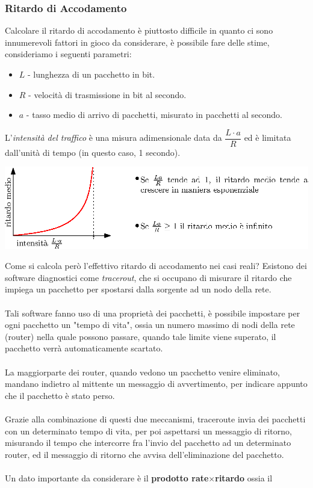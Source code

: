 \documentclass[12pt, letterpaper]{article}
\newcommand{\acc}{\\\hphantom{}\\}
\begin{document}
\subsubsection{Ritardo di Accodamento}\label{ritAccodamento}
Calcolare il ritardo di accodamento è piuttosto difficile in quanto ci sono innumerevoli fattori in gioco da
considerare, è possibile fare delle stime, consideriamo i seguenti parametri:\begin{itemize}
    \item $L$ - lunghezza di un pacchetto in bit.
    \item $R$ - velocità di trasmissione in bit al secondo.
    \item $a$ - tasso medio di arrivo di pacchetti, misurato in pacchetti al secondo.
\end{itemize}
L'\textit{intensità del traffico} è una misura adimensionale data da $\dfrac{L\cdot a}{R}$ ed è limitata
dall'unità di tempo (in questo caso, 1 secondo).\begin{center}
    \includegraphics[width=\textwidth ]{images/traffico.eps}
\end{center}
Come si calcola però l'effettivo ritardo di accodamento nei casi reali? Esistono dei software
diagnostici come \textit{tracerout}, che si occupano di misurare il ritardo che impiega un pacchetto
per spostarsi dalla sorgente ad un nodo della rete. \acc Tali software fanno uso di una proprietà dei pacchetti,
è possibile impostare per ogni pacchetto un "tempo di vita", ossia un numero massimo di nodi della rete (router)
nella quale possono passare, quando tale limite viene superato, il pacchetto verrà automaticamente scartato.\acc
La maggiorparte dei router, quando vedono un pacchetto venire eliminato, mandano indietro al mittente un messaggio di
avvertimento, per indicare appunto che il pacchetto è stato perso.\acc Grazie alla combinazione di questi due meccanismi,
traceroute invia dei pacchetti con un determinato tempo di vita, per poi aspettarsi un messaggio di ritorno, misurando il
tempo che intercorre fra l'invio del pacchetto ad un determinato router, ed il messaggio di ritorno che avvisa dell'eliminazione
del pacchetto.\acc
Un dato importante da considerare è il \textbf{prodotto rate$\times$ritardo} ossia il
\end{document}
